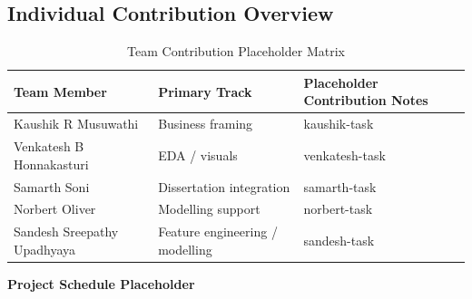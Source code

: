 \begin{copyrightenv}
\section*{Individual Contribution Overview}

\begin{table}[H]
\centering
\caption{Team Contribution Placeholder Matrix}
\label{tab:team_contributions}
\renewcommand{\arraystretch}{1.18}
\begin{tabular}{p{3.2cm}p{2.8cm}p{6.8cm}}
\toprule
\textbf{Team Member} & \textbf{Primary Track} & \textbf{Placeholder Contribution Notes} \\
\midrule
Kaushik R Musuwathi & Business framing & kaushik-task \\
Venkatesh B Honnakasturi & EDA / visuals & venkatesh-task \\
Samarth Soni & Dissertation integration & samarth-task \\
Norbert Oliver & Modelling support & norbert-task \\
Sandesh Sreepathy Upadhyaya & Feature engineering / modelling & sandesh-task \\
\bottomrule
\end{tabular}
\end{table}

\vspace{0.6em}
\noindent\textbf{Project Schedule Placeholder}

\begin{center}
\end{center}
\end{copyrightenv}
